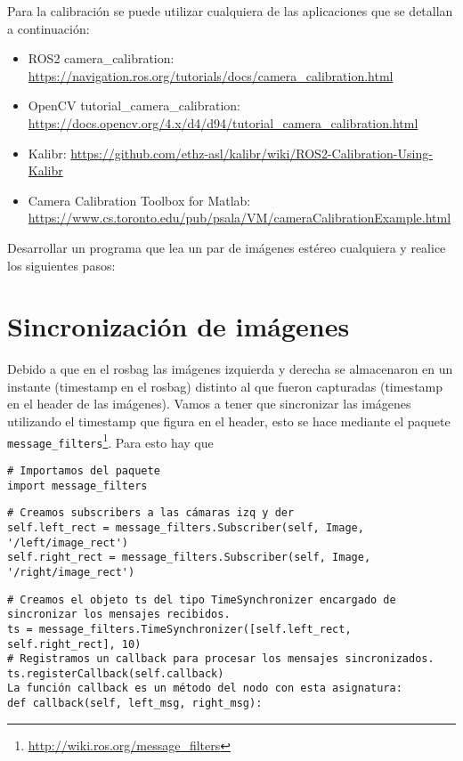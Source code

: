 \documentclass[tp]{lcc}
\begin{document}
Para la calibración se puede utilizar cualquiera de las aplicaciones que se detallan a continuación:
\begin{itemize}
	\item ROS2 camera\_calibration:  \url{https://navigation.ros.org/tutorials/docs/camera_calibration.html}
	\item OpenCV tutorial\_camera\_calibration:\\ \url{https://docs.opencv.org/4.x/d4/d94/tutorial_camera_calibration.html}
	\item Kalibr: \url{https://github.com/ethz-asl/kalibr/wiki/ROS2-Calibration-Using-Kalibr}
	\item Camera Calibration Toolbox for Matlab:\\ \url{https://www.cs.toronto.edu/pub/psala/VM/cameraCalibrationExample.html}
\end{itemize}

Desarrollar un programa que lea un par de imágenes estéreo cualquiera y realice los siguientes pasos:


\section{Sincronización de imágenes}
Debido a que en el rosbag las imágenes izquierda y derecha se almacenaron en un instante (timestamp en el rosbag) distinto al que fueron capturadas (timestamp en el header de las imágenes). Vamos a tener que sincronizar las imágenes utilizando el timestamp que figura en el header, esto se hace mediante el paquete \lstinline{message_filters}\footnote{\url{http://wiki.ros.org/message_filters}}. Para esto hay que 

\begin{lstlisting}[style=python]
# Importamos del paquete
import message_filters
\end{lstlisting}

\begin{lstlisting}[style=python] 
# Creamos subscribers a las cámaras izq y der
self.left_rect = message_filters.Subscriber(self, Image, '/left/image_rect')
self.right_rect = message_filters.Subscriber(self, Image, '/right/image_rect')
\end{lstlisting}

\begin{lstlisting}[style=python] 
# Creamos el objeto ts del tipo TimeSynchronizer encargado de sincronizar los mensajes recibidos.
ts = message_filters.TimeSynchronizer([self.left_rect, self.right_rect], 10)
# Registramos un callback para procesar los mensajes sincronizados.
ts.registerCallback(self.callback)
La función callback es un método del nodo con esta asignatura:
def callback(self, left_msg, right_msg):
\end{lstlisting}
\end{document}
